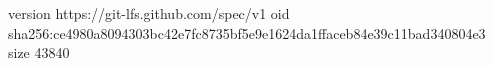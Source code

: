 version https://git-lfs.github.com/spec/v1
oid sha256:ce4980a8094303bc42e7fc8735bf5e9e1624da1ffaceb84e39c11bad340804e3
size 43840
